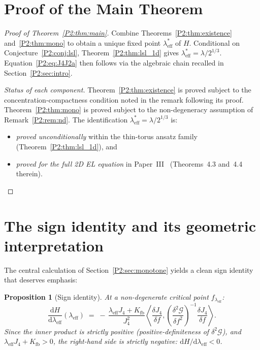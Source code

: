 \documentclass[11pt,a4paper]{article}
\newcommand{\lam}{\lambda}
\newcommand{\leff}{\lambda_{\mathrm{eff}}}
\newcommand{\Kfb}{K_{\mathrm{fb}}}
\newcommand{\Jfour}{J_{4}}
\newcommand{\G}{\mathcal{G}}
\newtheorem{proposition}[theorem]{Proposition}
\theoremstyle{remark}
\begin{document}
\section{Proof of the Main Theorem}
\label{P2:sec:proof}

\begin{proof}[Proof of Theorem~\ref{P2:thm:main}]
Combine Theorems~\ref{P2:thm:existence} and~\ref{P2:thm:mono} to obtain a
unique fixed point $\leff^*$ of $H$.
Conditional on Conjecture~\ref{P2:conj:lsl}, Theorem~\ref{P2:thm:lsl_1d}
gives $\leff^* = \lam/2^{1/3}$.
Equation~\eqref{P2:eq:J4J2a} then follows via the algebraic chain
recalled in Section~\ref{P2:sec:intro}.

\textit{Status of each component.}
Theorem~\ref{P2:thm:existence} is proved subject to the
concentration-compactness condition noted in the remark
following its proof.
Theorem~\ref{P2:thm:mono} is proved subject to the non-degeneracy
assumption of Remark~\ref{P2:rem:nd}.
The identification $\leff^* = \lam/2^{1/3}$ is:
\begin{itemize}[noitemsep]
  \item \emph{proved unconditionally} within the thin-torus ansatz
    family (Theorem~\ref{P2:thm:lsl_1d}), and
  \item \emph{proved for the full 2D EL equation} in
    Paper~III~\cite{Paper3} (Theorems~4.3 and~4.4 therein).
\end{itemize}
\end{proof}

\section{The sign identity and its geometric interpretation}
\label{P2:sec:sign}

The central calculation of Section~\ref{P2:sec:monotone} yields a
clean sign identity that deserves emphasis:

\begin{proposition}[Sign identity]
\label{P2:prop:sign}
At a non-degenerate critical point $f_{\leff}$:
\begin{equation}
  \frac{\mathrm{d}H}{\mathrm{d}\leff}(\leff)
  \;=\;
  -\,\frac{\leff\Jfour + \Kfb}{\Jfour^2}
  \left\langle \frac{\delta\Jfour}{\delta f},
  \left(\frac{\delta^2\G}{\delta f^2}\right)^{-1}
  \frac{\delta\Jfour}{\delta f}\right\rangle.
  \label{P2:eq:sign}
\end{equation}
Since the inner product is strictly positive (positive-definiteness
of $\delta^2\G$), and $\leff\Jfour+\Kfb>0$, the right-hand side
is strictly negative: $\mathrm{d}H/\mathrm{d}\leff < 0$.
\end{proposition}
\end{document}
